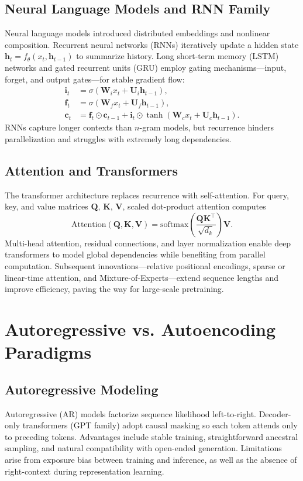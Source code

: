 \documentclass{article}
\begin{document}
\subsection{Neural Language Models and RNN Family}
Neural language models introduced distributed embeddings and nonlinear composition. Recurrent neural networks (RNNs) iteratively update a hidden state $\mathbf{h}_t = f_{\theta}(x_t, \mathbf{h}_{t-1})$ to summarize history. Long short-term memory (LSTM) networks and gated recurrent units (GRU) employ gating mechanisms—input, forget, and output gates—for stable gradient flow:
\begin{align}
  \mathbf{i}_t &= \sigma(\mathbf{W}_i x_t + \mathbf{U}_i \mathbf{h}_{t-1}), \\
  \mathbf{f}_t &= \sigma(\mathbf{W}_f x_t + \mathbf{U}_f \mathbf{h}_{t-1}), \\
  \mathbf{c}_t &= \mathbf{f}_t \odot \mathbf{c}_{t-1} + \mathbf{i}_t \odot \tanh(\mathbf{W}_c x_t + \mathbf{U}_c \mathbf{h}_{t-1}).
\end{align}
RNNs capture longer contexts than $n$-gram models, but recurrence hinders parallelization and struggles with extremely long dependencies.

\subsection{Attention and Transformers}
The transformer architecture replaces recurrence with self-attention. For query, key, and value matrices $\mathbf{Q}$, $\mathbf{K}$, $\mathbf{V}$, scaled dot-product attention computes
\begin{equation}
  \mathrm{Attention}(\mathbf{Q}, \mathbf{K}, \mathbf{V}) = \mathrm{softmax}\left( \frac{\mathbf{Q}\mathbf{K}^{\top}}{\sqrt{d_k}} \right) \mathbf{V}.
\end{equation}
Multi-head attention, residual connections, and layer normalization enable deep transformers to model global dependencies while benefiting from parallel computation. Subsequent innovations—relative positional encodings, sparse or linear-time attention, and Mixture-of-Experts—extend sequence lengths and improve efficiency, paving the way for large-scale pretraining.

\section{Autoregressive vs. Autoencoding Paradigms}
\subsection{Autoregressive Modeling}
Autoregressive (AR) models factorize sequence likelihood left-to-right. Decoder-only transformers (GPT family) adopt causal masking so each token attends only to preceding tokens. Advantages include stable training, straightforward ancestral sampling, and natural compatibility with open-ended generation. Limitations arise from exposure bias between training and inference, as well as the absence of right-context during representation learning.
\end{document}
